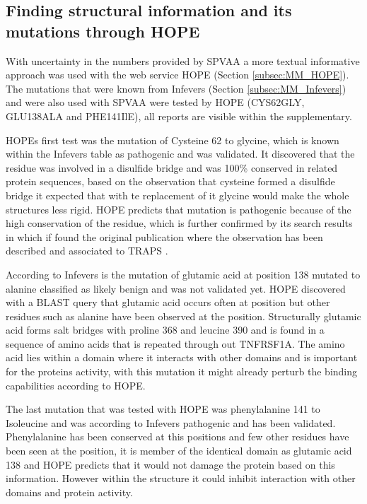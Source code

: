 	\newpage
	
	
	
\newpage	
\subsection{Finding structural information and its mutations through HOPE}
	With uncertainty in the numbers provided by SPVAA a more textual informative approach was used with the web service HOPE (Section \ref{subsec:MM_HOPE}). The mutations that were known from Infevers (Section \ref{subsec:MM_Infevers}) and were also used with SPVAA were tested by HOPE (CYS62GLY, GLU138ALA and PHE141IlE), all reports are visible within the supplementary.
	
	HOPEs first test was the mutation of Cysteine 62 to glycine, which is known within the Infevers table as pathogenic and was validated. It discovered that the residue was involved in a disulfide bridge and was 100\% conserved in related protein sequences, based on the observation that cysteine formed a disulfide bridge it expected that with te replacement of it glycine would make the whole structures less rigid. HOPE predicts that mutation is pathogenic because of the high conservation of the residue, which is further confirmed by its search results in which if found the original publication where the observation has been described and associated to TRAPS \cite{}.
	
	According to Infevers is the mutation of glutamic acid at position 138 mutated to alanine classified as likely benign and was not validated yet. HOPE discovered with a BLAST query that glutamic acid occurs often at position but other residues such as alanine have been observed at the position. Structurally glutamic acid forms salt bridges with proline  368 and leucine 390 and is found in a sequence of amino acids that is repeated through out TNFRSF1A. The amino acid lies within a domain where it interacts with other domains and is important for the proteins activity, with this mutation it might already perturb the binding capabilities according to HOPE.
	
	The last mutation that was tested with HOPE was phenylalanine 141 to Isoleucine and was according to Infevers pathogenic and has been validated. Phenylalanine has been conserved at this positions and few other residues have been seen at the position, it is member of the identical domain as glutamic acid 138 and HOPE predicts that it would not damage the protein based on this information. However within the structure it could inhibit interaction with other domains and protein activity.
	
